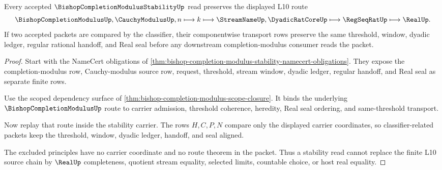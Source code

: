 \begin{theorem}
\label{thm:bishop-completion-modulus-stability-route}
Every accepted $\BishopCompletionModulusStabilityUp$ read preserves the displayed L10 route
$$
\BishopCompletionModulusUp,\CauchyModulusUp,n
\longmapsto k
\longmapsto \StreamNameUp,\DyadicRatCoreUp
\longmapsto \RegSeqRatUp
\longmapsto \RealUp .
$$
If two accepted packets are compared by the classifier, their componentwise transport rows preserve the same threshold, window, dyadic ledger, regular rational handoff, and Real seal before any downstream completion-modulus consumer reads the packet.
\end{theorem}
\begin{proof}
Start with the NameCert obligations of \autoref{thm:bishop-completion-modulus-stability-namecert-obligations}. They expose the completion-modulus row, Cauchy-modulus source row, request, threshold, stream window, dyadic ledger, regular handoff, and Real seal as separate finite rows.

Use the scoped dependency surface of \autoref{thm:bishop-completion-modulus-scope-closure}. It binds the underlying $\BishopCompletionModulusUp$ route to carrier admission, threshold coherence, heredity, Real seal ordering, and same-threshold transport.

Now replay that route inside the stability carrier. The rows $H,C,P,N$ compare only the displayed carrier coordinates, so classifier-related packets keep the threshold, window, dyadic ledger, handoff, and seal aligned.

The excluded principles have no carrier coordinate and no route theorem in the packet. Thus a stability read cannot replace the finite L10 source chain by $\RealUp$ completeness, quotient stream equality, selected limits, countable choice, or host real equality.
\end{proof}


